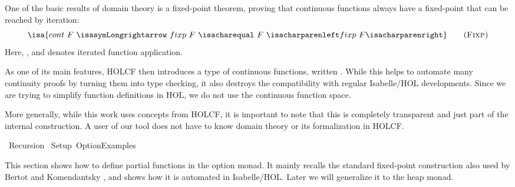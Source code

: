 \documentclass[copyright,creativecommons,sharealike]{eptcs}
\theoremstyle{remark}
\begin{document}
\begin{isabellebody}
\begin{isamarkuptext}
  One of the basic results of domain theory is a fixed-point theorem,
  proving that continuous functions always have a fixed-point that can
  be reached by iteration:
\begin{equation}
  \isa{cont\ F\ {\isasymLongrightarrow}\ fixp\ F\ {\isacharequal}\ F\ {\isacharparenleft}fixp\ F{\isacharparenright}}\tag{\sc Fixp}\label{fixp_eq}
\end{equation}
Here, , and  denotes iterated function
application.

As one of its main features, HOLCF then introduces a type of
continuous functions, written \isa{\isasymalpha\ {\isasymrightarrow}\ \isasymbeta}. While this helps to
automate many continuity proofs by turning them into type checking, it
also destroys the compatibility with regular Isabelle/HOL
developments.  Since we are trying to simplify function definitions in
HOL, we do not use the continuous function space.

More generally, while this work uses concepts from HOLCF, it is
important to note that this is completely transparent and just part
of the internal construction. A user of our tool does not have to know
  domain theory or its formalization in HOLCF.\end{isamarkuptext}\isamarkuptrue \isadelimtheory
\endisadelimtheory
\isatagtheory
{}\isamarkupfalse \endisatagtheory
{\isafoldtheory}\isadelimtheory
\endisadelimtheory
\end{isabellebody} \begin{isabellebody}\def\isabellecontext{Recursion}\isadelimtheory
\endisadelimtheory
\isatagtheory
{}\isamarkupfalse \ Recursion\isanewline
{}\ Setup\ Option{\isacharunderscore}Examples\isanewline
{}\endisatagtheory
{\isafoldtheory}\isadelimtheory
\endisadelimtheory
{}
\isamarkuptrue \label{recursion}
\begin{isamarkuptext}This section shows how to define partial functions in the option
  monad. It mainly recalls the standard fixed-point construction also
  used by Bertot and Komendantsky \cite{Bertot2008}, and shows how it
  is automated in Isabelle/HOL. Later we will generalize it to the
  heap monad.


\end{isamarkuptext}
\end{isabellebody}
\end{document}
